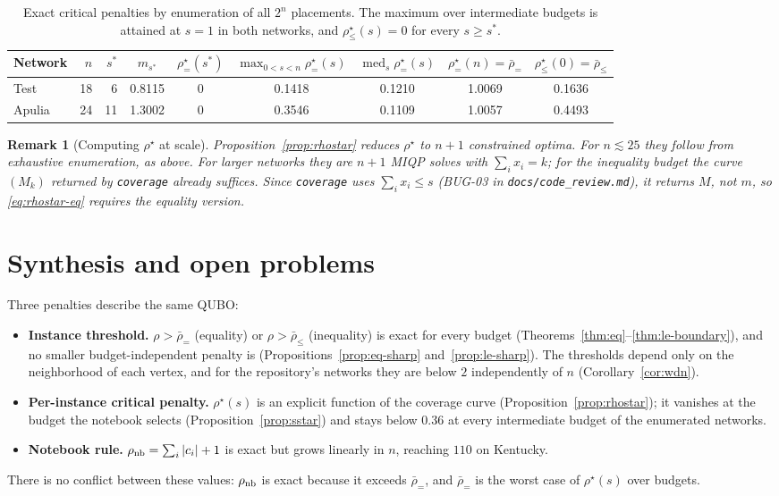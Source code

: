 \documentclass[11pt]{article}
\newtheorem{remark}[theorem]{Remark}
\newcommand{\rbeq}{\bar\rho_{=}}
\newcommand{\rble}{\bar\rho_{\le}}
\newcommand{\rseq}{\rho^\star_{=}}
\newcommand{\rsle}{\rho^\star_{\le}}
\begin{document}
\begin{table}[h]
\centering
\begin{tabular}{lrrcccccc}
\toprule
Network & $n$ & $s^\ast$ & $m_{s^\ast}$ & $\rseq(s^\ast)$ & $\max_{0<s<n}\rseq(s)$ & $\operatorname{med}_s\rseq(s)$ & $\rseq(n)=\rbeq$ & $\rsle(0)=\rble$\\
\midrule
Test   & 18 & 6  & 0.8115 & 0 & 0.1418 & 0.1210 & 1.0069 & 0.1636\\
Apulia & 24 & 11 & 1.3002 & 0 & 0.3546 & 0.1109 & 1.0057 & 0.4493\\
\bottomrule
\end{tabular}
\caption{Exact critical penalties by enumeration of all $2^n$ placements. The
maximum over intermediate budgets is attained at $s=1$ in both networks, and
$\rsle(s)=0$ for every $s\ge s^\ast$.}
\label{tab:rhostar}
\end{table}

\begin{remark}[Computing $\rho^\star$ at scale]
\label{rem:compute}
Proposition~\ref{prop:rhostar} reduces $\rho^\star$ to $n+1$ constrained optima.
For $n\lesssim25$ they follow from exhaustive enumeration, as above. For larger
networks they are $n+1$ MIQP solves with $\sum_ix_i=k$; for the inequality budget
the curve $(M_k)$ returned by \texttt{coverage} already suffices. Since
\texttt{coverage} uses $\sum_ix_i\le s$ (BUG-03 in
\texttt{docs/code\_review.md}), it returns $M$, not $m$, so \eqref{eq:rhostar-eq}
requires the equality version.
\end{remark}

\section{Synthesis and open problems}
\label{sec:synthesis}

Three penalties describe the same QUBO:
\begin{itemize}
\item \textbf{Instance threshold.} $\rho>\rbeq$ (equality) or $\rho>\rble$
(inequality) is exact for every budget (Theorems~\ref{thm:eq}--\ref{thm:le-boundary}),
and no smaller budget-independent penalty is (Propositions~\ref{prop:eq-sharp}
and~\ref{prop:le-sharp}). The thresholds depend only on the neighborhood of each
vertex, and for the repository's networks they are below $2$ independently of $n$
(Corollary~\ref{cor:wdn}).
\item \textbf{Per-instance critical penalty.} $\rho^\star(s)$ is an explicit
function of the coverage curve (Proposition~\ref{prop:rhostar}); it vanishes at
the budget the notebook selects (Proposition~\ref{prop:sstar}) and stays below
$0.36$ at every intermediate budget of the enumerated networks.
\item \textbf{Notebook rule.} $\rho_{\rm nb}=\sum_i|c_i|+1$ is exact but grows
linearly in $n$, reaching $110$ on Kentucky.
\end{itemize}
There is no conflict between these values: $\rho_{\rm nb}$ is exact because it
exceeds $\rbeq$, and $\rbeq$ is the worst case of $\rho^\star(s)$ over budgets.
\end{document}
